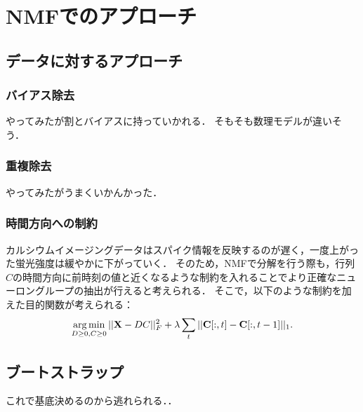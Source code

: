 \section{NMFでのアプローチ}
\subsection{データに対するアプローチ}
\subsubsection{バイアス除去}
やってみたが割とバイアスに持っていかれる．
そもそも数理モデルが違いそう．

\subsubsection{重複除去}
やってみたがうまくいかんかった．

\subsubsection{時間方向への制約}
カルシウムイメージングデータはスパイク情報を反映するのが遅く，一度上がった蛍光強度は緩やかに下がっていく．
そのため，NMFで分解を行う際も，行列$C$の時間方向に前時刻の値と近くなるような制約を入れることでより正確なニューロングループの抽出が行えると考えられる．
そこで，以下のような制約を加えた目的関数が考えられる：
\begin{equation}
	\operatorname*{arg\,min}_{D \geq 0, C \geq 0}||{\mathbf X - DC}||^2_F + \lambda \sum_t||{\mathbf C}[:,t] - {\mathbf C}[:,t-1]||_1.
  \label{eq:NMF-ar}
\end{equation}

\subsection{ブートストラップ}
これで基底決めるのから逃れられる．．
